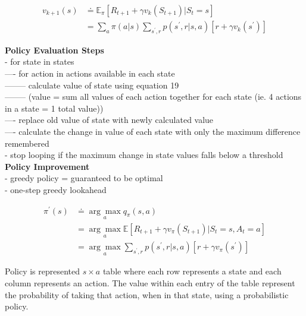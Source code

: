 \documentclass{article}
\begin{document}
\begin{equation}
\begin{aligned}
v_{k+1}(s) & \doteq \mathbb{E}_{\pi}\left[R_{t+1}+\gamma v_{k}\left(S_{t+1}\right) | S_{t}=s\right] \\
&=\sum_{a} \pi(a | s) \sum_{s^{\prime}, r} p\left(s^{\prime}, r | s, a\right)\left[r+\gamma v_{k}\left(s^{\prime}\right)\right]
\end{aligned}
\end{equation}

\noindent
\textbf{Policy Evaluation Steps}\\
- for state in states\\
---- for action in actions available in each state\\
-------- calculate value of state using equation 19 \\
-------- (value = sum all values of each action together for each state (ie. 4
actions in a state = 1 total value))\\
---- replace old value of state with newly calculated value\\
---- calculate the change in value of each state with only the maximum
difference remembered\\
- stop looping if the maximum change in state values falls below a threshold\\

\newpage
\noindent
\textbf{Policy Improvement}\\
- greedy policy = guaranteed to be optimal\\
- one-step greedy lookahead

\begin{equation}
\begin{aligned}
\pi^{\prime}(s) & \doteq \underset{a}{\arg \max } q_{\pi}(s, a) \\
&=\underset{a}{\arg \max } \mathbb{E}\left[R_{t+1}+\gamma v_{\pi}\left(S_{t+1}\right) | S_{t}=s, A_{t}=a\right] \\
&=\underset{a}{\arg \max } \sum_{s^{\prime}, r} p\left(s^{\prime}, r | s, a\right)\left[r+\gamma v_{\pi}\left(s^{\prime}\right)\right]
\end{aligned}
\end{equation}

\noindent
Policy is represented $s \times a$ table where each row represents a state and
each column represents an action. The value within each entry of the table
represent the probability of taking that action, when in that state, using a
probabilistic policy.\\
\end{document}
